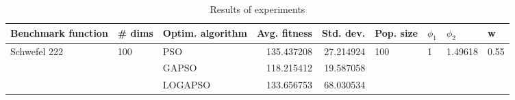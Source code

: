 \begin{table}
\centering
\caption{Results of experiments}
\begin{tabular}{lllrrllll}
\toprule
           Benchmark function &              \# dims & Optim. algorithm &  Avg. fitness &  Std. dev. &            Pop. size &         $\phi_{1}$ &               $\phi_{2}$ &                     w \\
\midrule
\multirow{3}{*}{Schwefel 222} & \multirow{3}{*}{100} &              PSO &    135.437208 &  27.214924 & \multirow{3}{*}{100} & \multirow{3}{*}{1} & \multirow{3}{*}{1.49618} & \multirow{3}{*}{0.55} \\
                              &                      &            GAPSO &    118.215412 &  19.587058 &                      &                    &                          &                       \\
                              &                      &          LOGAPSO &    133.656753 &  68.030534 &                      &                    &                          &                       \\
\bottomrule
\end{tabular}
\end{table}
